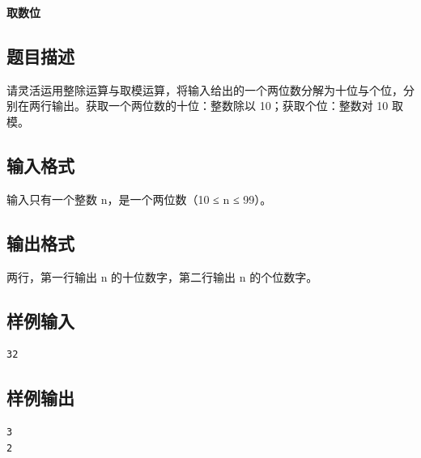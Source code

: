 \documentclass{article}
\newcommand{\problemname}[1]{\begin{center}\Large\bfseries #1\end{center}}
\begin{document}
\problemname{取数位}

\subsection*{题目描述}
请灵活运用整除运算与取模运算，将输入给出的一个两位数分解为十位与个位，分别在两行输出。获取一个两位数的十位：整数除以 10；获取个位：整数对 10 取模。

\subsection*{输入格式}
输入只有一个整数 n，是一个两位数（10 ≤ n ≤ 99）。

\subsection*{输出格式}
两行，第一行输出 n 的十位数字，第二行输出 n 的个位数字。

\subsection*{样例输入}
\begin{verbatim}
32
\end{verbatim}

\subsection*{样例输出}
\begin{verbatim}
3
2
\end{verbatim}
\end{document}

